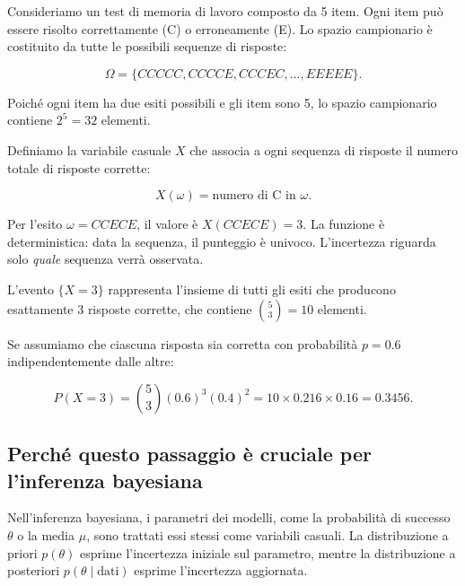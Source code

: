 \documentclass[
  italian,
  letterpaper,
  a4paper,
  11pt,
  open=any]{scrbook}
\theoremstyle{plain}
\theoremstyle{definition}
\theoremstyle{definition}
\theoremstyle{remark}
\begin{document}
\begin{tcolorbox}[enhanced jigsaw, arc=.35mm, bottomrule=.15mm, bottomtitle=1mm, breakable, colback=white, colbacktitle=quarto-callout-note-color!10!white, colframe=quarto-callout-note-color-frame, coltitle=black, left=2mm, leftrule=.75mm, opacityback=0, opacitybacktitle=0.6, rightrule=.15mm, title=\textcolor{quarto-callout-note-color}{\faInfo}\hspace{0.5em}{Esempio: punteggio in un test a scelta multipla}, titlerule=0mm, toprule=.15mm, toptitle=1mm]

Consideriamo un test di memoria di lavoro composto da 5 item. Ogni item
può essere risolto correttamente (C) o erroneamente (E). Lo spazio
campionario è costituito da tutte le possibili sequenze di risposte:

\[
\Omega = \{CCCCC, CCCCE, CCCEC, \ldots, EEEEE\}.
\]

Poiché ogni item ha due esiti possibili e gli item sono 5, lo spazio
campionario contiene \(2^5 = 32\) elementi.

Definiamo la variabile casuale \(X\) che associa a ogni sequenza di
risposte il numero totale di risposte corrette:

\[
X(\omega) = \text{numero di C in } \omega.
\]

Per l'esito \(\omega = CCECE\), il valore è \(X(CCECE) = 3\). La
funzione è deterministica: data la sequenza, il punteggio è univoco.
L'incertezza riguarda solo \emph{quale} sequenza verrà osservata.

L'evento \(\{X = 3\}\) rappresenta l'insieme di tutti gli esiti che
producono esattamente 3 risposte corrette, che contiene
\(\binom{5}{3} = 10\) elementi.

Se assumiamo che ciascuna risposta sia corretta con probabilità
\(p = 0.6\) indipendentemente dalle altre:

\[
P(X = 3) = \binom{5}{3} (0.6)^3 (0.4)^2 = 10 \times 0.216 \times 0.16 = 0.3456.
\]

\end{tcolorbox}

\subsection{Perché questo passaggio è cruciale per l'inferenza
bayesiana}\label{perchuxe9-questo-passaggio-uxe8-cruciale-per-linferenza-bayesiana}

Nell'inferenza bayesiana, i parametri dei modelli, come la probabilità
di successo \(\theta\) o la media \(\mu\), sono trattati essi stessi
come variabili casuali. La distribuzione a priori \(p(\theta)\) esprime
l'incertezza iniziale sul parametro, mentre la distribuzione a
posteriori \(p(\theta \mid \text{dati})\) esprime l'incertezza
aggiornata.
\end{document}
